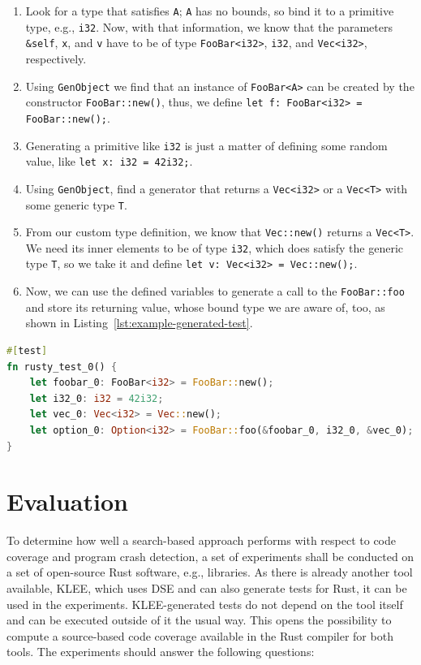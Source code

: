 \documentclass{article}
\begin{document}
\begin{enumerate}
    \item Look for a type that satisfies \lstinline{A}; \lstinline{A} has no bounds, so bind it to a primitive type, e.g., \lstinline{i32}. Now, with that information, we know that the parameters \lstinline{&self}, \lstinline{x}, and \lstinline{v} have to be of type \lstinline{FooBar<i32>}, \lstinline{i32}, and \lstinline{Vec<i32>}, respectively.
    \item Using \lstinline{GenObject} we find that an instance of \lstinline{FooBar<A>} can be created by the constructor \lstinline{FooBar::new()}, thus, we define \lstinline{let f: FooBar<i32> = FooBar::new();}.
    \item Generating a primitive like \lstinline{i32} is just a matter of defining some random value, like \lstinline{let x: i32 = 42i32;}.
    \item Using \lstinline{GenObject}, find a generator that returns a \lstinline{Vec<i32>} or a \lstinline{Vec<T>} with some generic type \lstinline{T}.
    \item From our custom type definition, we know that \lstinline{Vec::new()} returns a \lstinline{Vec<T>}. We need its inner elements to be of type \lstinline{i32}, which does satisfy the generic type \lstinline{T}, so we take it and define \lstinline{let v: Vec<i32> = Vec::new();}.
    \item Now, we can use the defined variables to generate a call to the \lstinline{FooBar::foo} and store its returning value, whose bound type we are aware of, too, as shown in Listing~\ref{lst:example-generated-test}.
\end{enumerate}

\begin{lstlisting}[language=Rust, style=boxed, caption={An example test that invokes \lstinline{FooBar::foo}}, label=lst:example-generated-test]
#[test]
fn rusty_test_0() {
    let foobar_0: FooBar<i32> = FooBar::new();
    let i32_0: i32 = 42i32;
    let vec_0: Vec<i32> = Vec::new();
    let option_0: Option<i32> = FooBar::foo(&foobar_0, i32_0, &vec_0);
}
\end{lstlisting}

\newpage
\section{Evaluation}
To determine how well a search-based approach performs with respect to code coverage and program crash detection, a set of experiments shall be conducted on a set of open-source Rust software, e.g., libraries. As there is already another tool available, KLEE, which uses \ac{DSE} and can also generate tests for Rust, it can be used in the experiments. KLEE-generated tests do not depend on the tool itself and can be executed outside of it the usual way. This opens the possibility to compute a source-based code coverage available in the Rust compiler for both tools. The experiments should answer the following questions:
\end{document}
